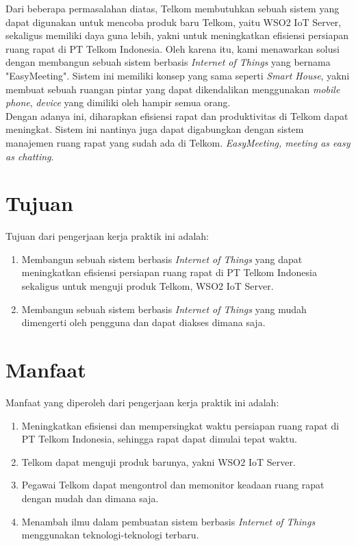 \tab Dari beberapa permasalahan diatas, Telkom membutuhkan sebuah sistem yang dapat digunakan untuk mencoba produk baru Telkom, yaitu WSO2 IoT Server, sekaligus memiliki daya guna lebih, yakni untuk meningkatkan efisiensi persiapan ruang rapat di PT Telkom Indonesia. Oleh karena itu, kami menawarkan solusi dengan membangun sebuah sistem berbasis \textit{Internet of Things} yang bernama "EasyMeeting". Sistem ini memiliki konsep yang sama seperti \textit{Smart House}, yakni membuat sebuah ruangan pintar yang dapat dikendalikan menggunakan \textit{mobile phone}, \textit{device} yang dimiliki oleh hampir semua orang. \\
\tab Dengan adanya \namaSistem ini, diharapkan efisiensi rapat dan produktivitas di Telkom dapat meningkat. Sistem ini nantinya juga dapat digabungkan dengan sistem manajemen ruang rapat yang sudah ada di Telkom. \textit{EasyMeeting, meeting as easy as chatting}.  

\section{Tujuan}
\tab Tujuan dari pengerjaan kerja praktik ini adalah:
\begin{enumerate}
	\item Membangun sebuah sistem berbasis \textit{Internet of Things} yang dapat meningkatkan efisiensi persiapan ruang rapat di PT Telkom Indonesia sekaligus untuk menguji produk Telkom, WSO2 IoT Server.
	\item Membangun sebuah sistem berbasis \textit{Internet of Things} yang mudah dimengerti oleh pengguna dan dapat diakses dimana saja.
\end{enumerate}

\section{Manfaat}
\tab Manfaat yang diperoleh dari pengerjaan kerja praktik ini adalah:
\begin{enumerate}
	\item Meningkatkan efisiensi dan mempersingkat waktu persiapan ruang rapat di PT Telkom Indonesia, sehingga rapat dapat dimulai tepat waktu.
	\item Telkom dapat menguji produk barunya, yakni WSO2 IoT Server.
	\item Pegawai Telkom dapat mengontrol dan memonitor keadaan ruang rapat dengan mudah dan dimana saja.
	\item Menambah ilmu dalam pembuatan sistem berbasis \textit{Internet of Things} menggunakan teknologi-teknologi terbaru.
\end{enumerate}

